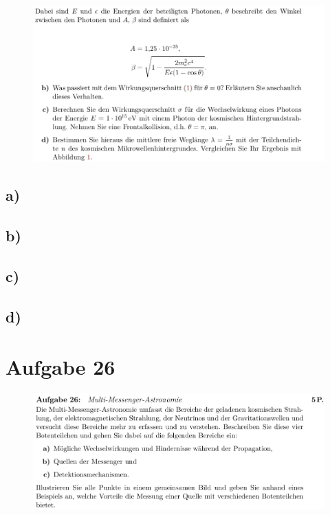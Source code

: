     \begin{figure}[H]
        \centering
        \includegraphics[width=\textwidth]{images/Aufgabe25b.jpg}
        \label{fig:2}
    \end{figure}

\subsection{a)}\justifying

\subsection{b)}\justifying

\subsection{c)}\justifying

\subsection{d)}\justifying



\section{Aufgabe 26}

    \begin{figure}[H]
        \centering
        \includegraphics[width=\textwidth]{images/Aufgabe26.jpg}
        \label{fig:3}
    \end{figure}

